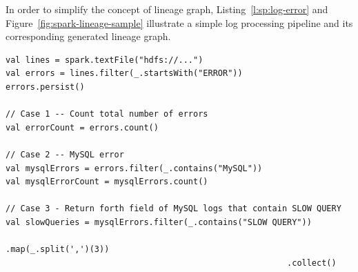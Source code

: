 In order to simplify the concept of lineage graph, Listing~\ref{l:sp:log-error} and Figure~\ref{fig:spark-lineage-sample} illustrate a simple log processing pipeline and its corresponding generated lineage graph.
\begin{lstlisting}[float=!htbp, caption={Parsing Errors in Log Files From HDFS},label={l:sp:log-error},captionpos=b,morekeywords={val}]
val lines = spark.textFile("hdfs://...")
val errors = lines.filter(_.startsWith("ERROR"))
errors.persist()

// Case 1 -- Count total number of errors
val errorCount = errors.count()

// Case 2 -- MySQL error
val mysqlErrors = errors.filter(_.contains("MySQL"))
val mysqlErrorCount = mysqlErrors.count()

// Case 3 - Return forth field of MySQL logs that contain SLOW QUERY
val slowQueries = mysqlErrors.filter(_.contains("SLOW QUERY"))
                                                         .map(_.split(',')(3))
                                                         .collect()
\end{lstlisting}
